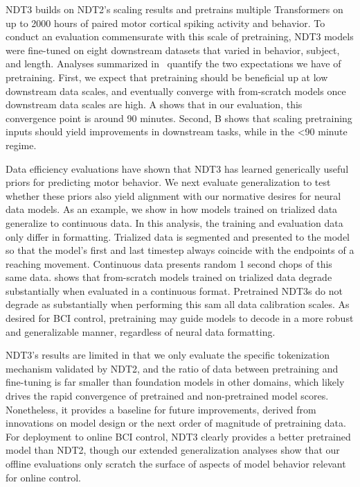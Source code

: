 \documentclass[12pt,oneside]{report}
\begin{document}
NDT3 builds on NDT2’s scaling results and pretrains multiple Transformers on up to 2000 hours of paired motor cortical spiking activity and behavior. To conduct an evaluation commensurate with this scale of pretraining, NDT3 models were fine-tuned on eight downstream datasets that varied in behavior, subject, and length. Analyses summarized in~ quantify the two expectations we have of pretraining. First, we expect that pretraining should be beneficial up at low downstream data scales, and eventually converge with from-scratch models once downstream data scales are high. A shows that in our evaluation, this convergence point is around 90 minutes. Second, B shows that scaling pretraining inputs should yield improvements in downstream tasks, while in the <90 minute regime.

Data efficiency evaluations have shown that NDT3 has learned generically useful priors for predicting motor behavior. We next evaluate generalization to test whether these priors also yield alignment with our normative desires for neural data models. As an example, we show in  how models trained on trialized data generalize to continuous data.
In this analysis, the training and evaluation data only differ in formatting. Trialized data is segmented and presented to the model so that the model's first and last timestep always coincide with the endpoints of a reaching movement. Continuous data presents random 1 second chops of this same data.  shows that from-scratch models trained on trialized data degrade substantially when evaluated in a continuous format. Pretrained NDT3s do not degrade as substantially when performing this sam all data calibration scales. As desired for BCI control, pretraining may guide models to decode in a more robust and generalizable manner, regardless of neural data formatting.

NDT3’s results are limited in that we only evaluate the specific tokenization mechanism validated by NDT2, and the ratio of data between pretraining and fine-tuning is far smaller than foundation models in other domains, which likely drives the rapid convergence of pretrained and non-pretrained model scores. Nonetheless, it provides a baseline for future improvements, derived from innovations on model design or the next order of magnitude of pretraining data. For deployment to online BCI control, NDT3 clearly provides a better pretrained model than NDT2, though our extended generalization analyses show that our offline evaluations only scratch the surface of aspects of model behavior relevant for online control.
\end{document}
